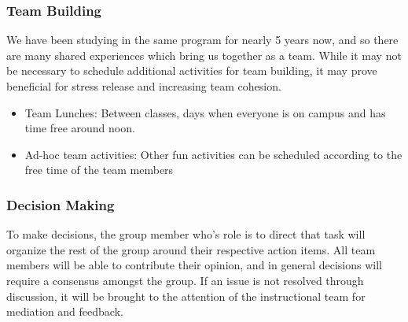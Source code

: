 \documentclass{article}
\begin{document}
\subsubsection*{Team Building}

We have been studying in the same program for nearly 5 years now, and
so there are many shared
experiences which bring us together as a team. While it may not be
necessary to schedule additional activities
for team building, it may prove beneficial for stress release and
increasing team cohesion.
\begin{itemize}
  \item Team Lunches: Between classes, days when everyone is on
    campus and has time free around noon.
  \item Ad-hoc team activities: Other fun activities can be scheduled
    according to the free time of the team
    members
\end{itemize}

\subsubsection*{Decision Making}

To make decisions, the group member who's role is to direct that task
will organize the rest of the group
around their respective action items. All team members will be able
to contribute their opinion, and in general
decisions will require a consensus amongst the group. If an issue is
not resolved through discussion, it will be
brought to the attention of the instructional team for mediation and feedback.
\end{document}
